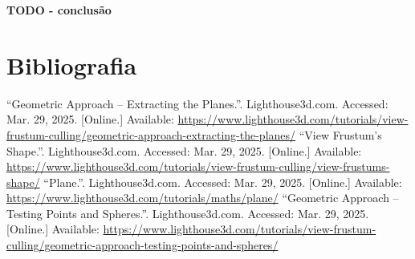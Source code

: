 \documentclass[12pt, a4paper]{article}
\begin{document}
\textbf{\color{red} TODO - conclusão}

\begingroup
\section{Bibliografia}
\renewcommand{\section}[2]{}

\begin{thebibliography}{9}
        ``Geometric Approach -- Extracting the Planes.''. Lighthouse3d.com. Accessed:
        Mar. 29, 2025. [Online.] Available:
        \url{https://www.lighthouse3d.com/tutorials/view-frustum-culling/geometric-approach-extracting-the-planes/}
        ``View Frustum’s Shape.''. Lighthouse3d.com. Accessed:
        Mar. 29, 2025. [Online.] Available:
        \url{https://www.lighthouse3d.com/tutorials/view-frustum-culling/view-frustums-shape/}
        ``Plane.''. Lighthouse3d.com. Accessed:
        Mar. 29, 2025. [Online.] Available:
        \url{https://www.lighthouse3d.com/tutorials/maths/plane/}
        ``Geometric Approach -- Testing Points and Spheres.''. Lighthouse3d.com. Accessed:
        Mar. 29, 2025. [Online.] Available:
        \url{https://www.lighthouse3d.com/tutorials/view-frustum-culling/geometric-approach-testing-points-and-spheres/}
\end{thebibliography}
\endgroup
\end{document}
